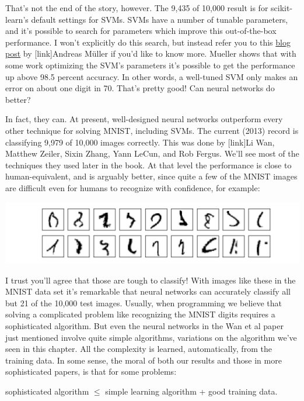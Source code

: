 \documentclass[a4paper,twoside,10pt]{book}
\begin{document}
That's not the end of the story, however. The 9,435 of 10,000 result is for scikit-learn's default settings for SVMs. SVMs have a number of tunable parameters, and it's possible to search for parameters which improve this out-of-the-box performance. I won't explicitly do this search, but instead refer you to this \href{http://peekaboo-vision.blogspot.de/2010/09/mnist-for-ever.html}{blog post} by [link]Andreas M\"{u}ller if you'd like to know more. Mueller shows that with some work optimizing the SVM's parameters it's possible to get the performance up above 98.5 percent accuracy. In other words, a well-tuned SVM only makes an error on about one digit in 70. That's pretty good! Can neural networks do better?

In fact, they can. At present, well-designed neural networks outperform every other technique for solving MNIST, including SVMs. The current (2013) record is classifying 9,979 of 10,000 images correctly. This was done by [link]Li Wan, Matthew Zeiler, Sixin Zhang, Yann LeCun, and Rob Fergus. We'll see most of the techniques they used later in the book. At that level the performance is close to human-equivalent, and is arguably better, since quite a few of the MNIST images are difficult even for humans to recognize with confidence, for example:
\begin{center}
	\includegraphics[scale=0.35]{./figures/ch1/mnist_really_bad_images}
\end{center}
I trust you'll agree that those are tough to classify! With images like these in the MNIST data set it's remarkable that neural networks can accurately classify all but 21 of the 10,000 test images. Usually, when programming we believe that solving a complicated problem like recognizing the MNIST digits requires a sophisticated algorithm. But even the neural networks in the Wan et al paper just mentioned involve quite simple algorithms, variations on the algorithm we've seen in this chapter. All the complexity is learned, automatically, from the training data. In some sense, the moral of both our results and those in more sophisticated papers, is that for some problems:
\begin{center}
sophisticated algorithm $\le$ simple learning algorithm + good training data.
\end{center}
\end{document}
